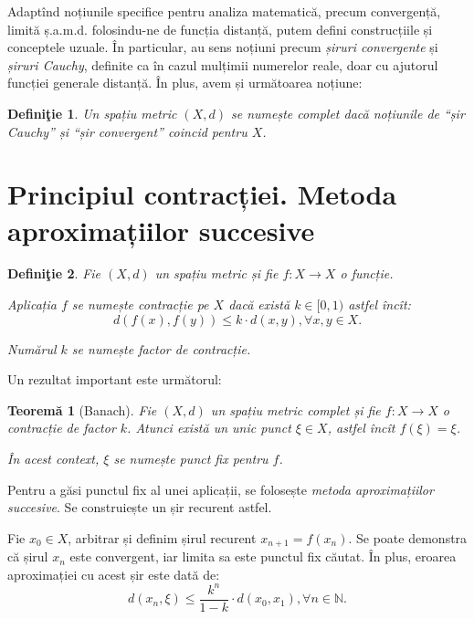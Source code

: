 \documentclass[11pt,a4paper]{article}
\newcommand\qq{\enquote}
\newcommand\NN{\mathbb{N}}
\theoremstyle{dotless}
\newtheorem{theorem}{Teorem\u{a}}[section]
\theoremstyle{dotlessdr}
\newtheorem{definition}{Defini\c{t}ie}[section]
\begin{document}
Adaptînd noțiunile specifice pentru analiza matematică, precum convergență,
limită ș.a.m.d. folosindu-ne de funcția distanță, putem defini construcțiile
și conceptele uzuale. În particular, au sens noțiuni precum \emph{șiruri convergente}
și \emph{șiruri Cauchy}, definite ca în cazul mulțimii numerelor reale, doar
cu ajutorul funcției generale distanță. În plus, avem și următoarea noțiune:

\begin{definition}\label{def:spatiu-complet}
  Un spațiu metric $(X, d)$ se numește \emph{complet} dacă noțiunile de
  \qq{șir Cauchy} și \qq{șir convergent} coincid pentru $X$.
\end{definition}


\section{Principiul contracției. Metoda aproximațiilor succesive}
\label{sec:contractie}

\begin{definition}\label{def:contractie}
  Fie $(X, d)$ un spațiu metric și fie $f : X \to X$ o funcție.

  Aplicația $f$ se numește \emph{contracție pe $X$} dacă există $k \in [0, 1)$
  astfel încît:
  \[
    d(f(x), f(y)) \leq k \cdot d(x, y), \forall x, y \in X.
  \]

  Numărul $k$ se numește \emph{factor de contracție}.
\end{definition}

Un rezultat important este următorul:

\begin{theorem}[Banach]\label{thm:banach-fix}
  Fie $(X, d)$ un spațiu metric complet și fie $f : X \to X$ o contracție de factor
  $k$. Atunci există un unic punct $\xi \in X$, astfel încît $f(\xi) = \xi$.

  În acest context, $\xi$ se numește \emph{punct fix} pentru $f$.
\end{theorem}

Pentru a găsi punctul fix al unei aplicații, se folosește \emph{metoda %
  aproximațiilor succesive}. Se construiește un șir recurent astfel.

Fie $x_0 \in X$, arbitrar și definim șirul recurent $x_{n+1} = f(x_n)$.
Se poate demonstra că șirul $x_n$ este convergent, iar limita sa este punctul
fix căutat. În plus, eroarea aproximației cu acest șir este dată de:
\[
  d(x_n, \xi) \leq \frac{k^n}{1 - k} \cdot d(x_0, x_1), \forall n \in \NN.
\]
\end{document}
